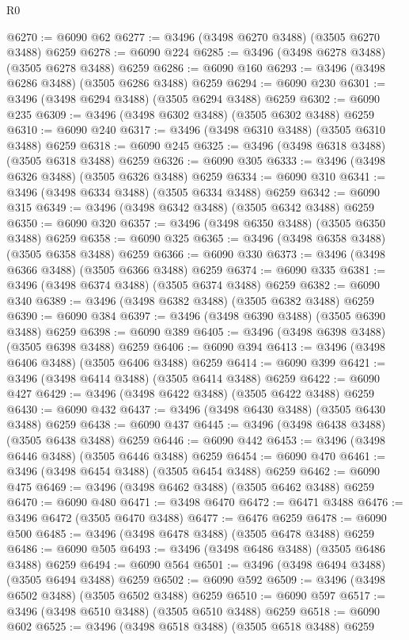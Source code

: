 \begin{lexlean}{R0}
\begin{coremodule}
@6270 := @6090 @62
@6277 := @3496 (@3498 @6270 @3488) (@3505 @6270 @3488) @6259
@6278 := @6090 @224
@6285 := @3496 (@3498 @6278 @3488) (@3505 @6278 @3488) @6259
@6286 := @6090 @160
@6293 := @3496 (@3498 @6286 @3488) (@3505 @6286 @3488) @6259
@6294 := @6090 @230
@6301 := @3496 (@3498 @6294 @3488) (@3505 @6294 @3488) @6259
@6302 := @6090 @235
@6309 := @3496 (@3498 @6302 @3488) (@3505 @6302 @3488) @6259
@6310 := @6090 @240
@6317 := @3496 (@3498 @6310 @3488) (@3505 @6310 @3488) @6259
@6318 := @6090 @245
@6325 := @3496 (@3498 @6318 @3488) (@3505 @6318 @3488) @6259
@6326 := @6090 @305
@6333 := @3496 (@3498 @6326 @3488) (@3505 @6326 @3488) @6259
@6334 := @6090 @310
@6341 := @3496 (@3498 @6334 @3488) (@3505 @6334 @3488) @6259
@6342 := @6090 @315
@6349 := @3496 (@3498 @6342 @3488) (@3505 @6342 @3488) @6259
@6350 := @6090 @320
@6357 := @3496 (@3498 @6350 @3488) (@3505 @6350 @3488) @6259
@6358 := @6090 @325
@6365 := @3496 (@3498 @6358 @3488) (@3505 @6358 @3488) @6259
@6366 := @6090 @330
@6373 := @3496 (@3498 @6366 @3488) (@3505 @6366 @3488) @6259
@6374 := @6090 @335
@6381 := @3496 (@3498 @6374 @3488) (@3505 @6374 @3488) @6259
@6382 := @6090 @340
@6389 := @3496 (@3498 @6382 @3488) (@3505 @6382 @3488) @6259
@6390 := @6090 @384
@6397 := @3496 (@3498 @6390 @3488) (@3505 @6390 @3488) @6259
@6398 := @6090 @389
@6405 := @3496 (@3498 @6398 @3488) (@3505 @6398 @3488) @6259
@6406 := @6090 @394
@6413 := @3496 (@3498 @6406 @3488) (@3505 @6406 @3488) @6259
@6414 := @6090 @399
@6421 := @3496 (@3498 @6414 @3488) (@3505 @6414 @3488) @6259
@6422 := @6090 @427
@6429 := @3496 (@3498 @6422 @3488) (@3505 @6422 @3488) @6259
@6430 := @6090 @432
@6437 := @3496 (@3498 @6430 @3488) (@3505 @6430 @3488) @6259
@6438 := @6090 @437
@6445 := @3496 (@3498 @6438 @3488) (@3505 @6438 @3488) @6259
@6446 := @6090 @442
@6453 := @3496 (@3498 @6446 @3488) (@3505 @6446 @3488) @6259
@6454 := @6090 @470
@6461 := @3496 (@3498 @6454 @3488) (@3505 @6454 @3488) @6259
@6462 := @6090 @475
@6469 := @3496 (@3498 @6462 @3488) (@3505 @6462 @3488) @6259
@6470 := @6090 @480
@6471 := @3498 @6470
@6472 := @6471 @3488
@6476 := @3496 @6472 (@3505 @6470 @3488)
@6477 := @6476 @6259
@6478 := @6090 @500
@6485 := @3496 (@3498 @6478 @3488) (@3505 @6478 @3488) @6259
@6486 := @6090 @505
@6493 := @3496 (@3498 @6486 @3488) (@3505 @6486 @3488) @6259
@6494 := @6090 @564
@6501 := @3496 (@3498 @6494 @3488) (@3505 @6494 @3488) @6259
@6502 := @6090 @592
@6509 := @3496 (@3498 @6502 @3488) (@3505 @6502 @3488) @6259
@6510 := @6090 @597
@6517 := @3496 (@3498 @6510 @3488) (@3505 @6510 @3488) @6259
@6518 := @6090 @602
@6525 := @3496 (@3498 @6518 @3488) (@3505 @6518 @3488) @6259

\end{coremodule}
\end{lexlean}
